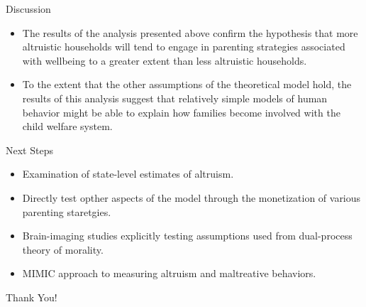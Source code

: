 \documentclass[handout]{beamer}
\begin{document}
\begin{frame}{Discussion}

\begin{itemize}[<+->]
\itemsep1pt\parskip0pt
\item
  The results of the analysis presented above confirm the hypothesis
  that more altruistic households will tend to engage in parenting
  strategies associated with wellbeing to a greater extent than less
  altruistic households.
\end{itemize}

\begin{itemize}[<+->]
\itemsep1pt\parskip0pt
\item
  To the extent that the other assumptions of the theoretical model
  hold, the results of this analysis suggest that relatively simple
  models of human behavior might be able to explain how families become
  involved with the child welfare system.
\end{itemize}

\end{frame}

\begin{frame}{Next Steps}

\begin{itemize}[<+->]
\itemsep1pt\parskip0pt
\item
  Examination of state-level estimates of altruism.
\end{itemize}

\begin{itemize}[<+->]
\itemsep1pt\parskip0pt
\item
  Directly test opther aspects of the model through the monetization of
  various parenting staretgies.
\end{itemize}

\begin{itemize}[<+->]
\itemsep1pt\parskip0pt
\item
  Brain-imaging studies explicitly testing assumptions used from
  dual-process theory of morality.
\end{itemize}

\begin{itemize}[<+->]
\itemsep1pt\parskip0pt
\item
  MIMIC approach to measuring altruism and maltreative behaviors.
\end{itemize}

\end{frame}

\begin{frame}{}

Thank You!

\end{frame}
\end{document}
